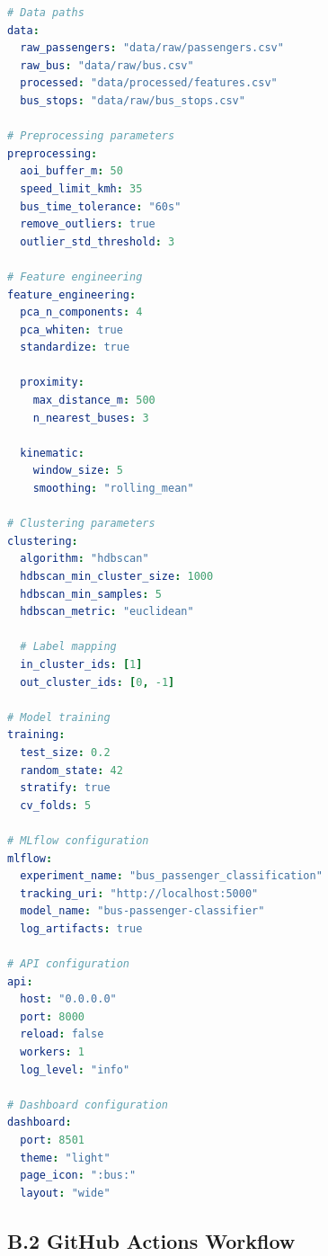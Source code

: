 \begin{lstlisting}[language=yaml, caption=Full Configuration File]
# Data paths
data:
  raw_passengers: "data/raw/passengers.csv"
  raw_bus: "data/raw/bus.csv"
  processed: "data/processed/features.csv"
  bus_stops: "data/raw/bus_stops.csv"

# Preprocessing parameters
preprocessing:
  aoi_buffer_m: 50
  speed_limit_kmh: 35
  bus_time_tolerance: "60s"
  remove_outliers: true
  outlier_std_threshold: 3

# Feature engineering
feature_engineering:
  pca_n_components: 4
  pca_whiten: true
  standardize: true
  
  proximity:
    max_distance_m: 500
    n_nearest_buses: 3
  
  kinematic:
    window_size: 5
    smoothing: "rolling_mean"

# Clustering parameters
clustering:
  algorithm: "hdbscan"
  hdbscan_min_cluster_size: 1000
  hdbscan_min_samples: 5
  hdbscan_metric: "euclidean"
  
  # Label mapping
  in_cluster_ids: [1]
  out_cluster_ids: [0, -1]

# Model training
training:
  test_size: 0.2
  random_state: 42
  stratify: true
  cv_folds: 5

# MLflow configuration
mlflow:
  experiment_name: "bus_passenger_classification"
  tracking_uri: "http://localhost:5000"
  model_name: "bus-passenger-classifier"
  log_artifacts: true

# API configuration
api:
  host: "0.0.0.0"
  port: 8000
  reload: false
  workers: 1
  log_level: "info"
  
# Dashboard configuration
dashboard:
  port: 8501
  theme: "light"
  page_icon: ":bus:"
  layout: "wide"
\end{lstlisting}

\subsection*{B.2 GitHub Actions Workflow}

